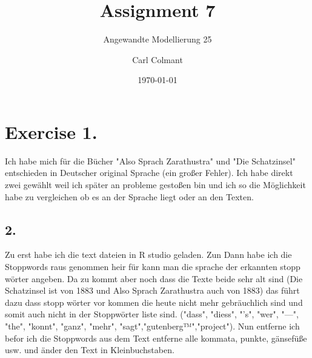 \documentclass{scrartcl}
\title{Assignment 7}
\subtitle{Angewandte Modellierung 25}
\author{Carl Colmant}
\date{\today}
\begin{document}
\maketitle
\newpage
\section*{Exercise 1. }
Ich habe mich für die Bücher "Also Sprach Zarathustra" und "Die Schatzinsel" entschieden in Deutscher original Sprache (ein großer Fehler). Ich habe direkt zwei gewählt weil ich später an probleme gestoßen bin und ich so die Möglichkeit habe zu vergleichen ob es an der Sprache liegt oder an den Texten.

\subsection*{2. }
Zu erst habe ich die text dateien in R studio geladen. Zun Dann habe ich die Stoppwords raus genommen heir für kann man die sprache der erkannten stopp wörter angeben. Da zu kommt aber noch dass die Texte beide sehr alt sind (Die Schatzinsel ist von 1883 und Also Sprach Zarathustra auch von 1883) das führt dazu dass stopp wörter vor kommen die heute nicht mehr gebräuchlich sind und somit auch nicht in der Stoppwörter liste sind. ("dass", "diess", "’s", "wer", "—", "the", "konnt", "ganz", "mehr", "sagt","gutenberg™","project"). Nun entferne ich befor ich die Stoppwords aus dem Text entferne alle kommata, punkte, gänsefüße usw. und änder den Text in Kleinbuchstaben.
\end{document}
